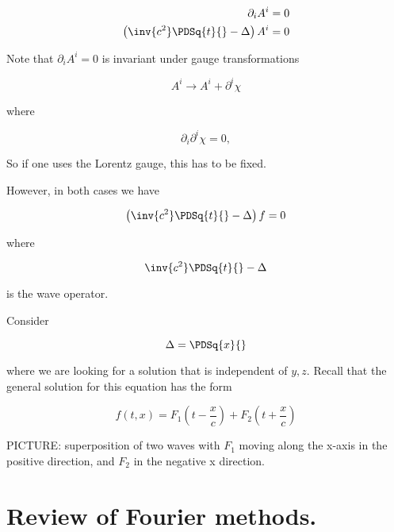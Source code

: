 \begin{align}\label{eqn:relativisticElectrodynamicsL15:30}
\partial_i A^i &= 0 \\
\left( \inv{c^2} \PDSq{t}{} - \Delta \right) A^i &= 0
\end{align}

Note that $\partial_i A^i = 0$ is invariant under gauge transformations

\begin{equation}\label{eqn:relativisticElectrodynamicsL15:50}
A^i \rightarrow A^i + \partial^i \chi
\end{equation}

where 

\begin{equation}\label{eqn:relativisticElectrodynamicsL15:70}
\partial_i \partial^i \chi = 0,
\end{equation}

So if one uses the Lorentz gauge, this has to be fixed.

However, in both cases we have 

\begin{equation}\label{eqn:relativisticElectrodynamicsL15:90}
\left( \inv{c^2} \PDSq{t}{} - \Delta \right) f = 0
\end{equation}

where 

\begin{equation}\label{eqn:relativisticElectrodynamicsL15:110}
\inv{c^2} \PDSq{t}{} - \Delta 
\end{equation}

is the wave operator.

Consider 

\begin{equation}\label{eqn:relativisticElectrodynamicsL15:130}
\Delta = \PDSq{x}{}
\end{equation}

where we are looking for a solution that is independent of $y, z$.  Recall that the general solution for this equation has the form

\begin{equation}\label{eqn:relativisticElectrodynamicsL15:150}
f(t, x) = 
F_1 \left(t - \frac{x}{c}\right)
+F_2 \left(t + \frac{x}{c}\right)
\end{equation}

PICTURE: superposition of two waves with $F_1$ moving along the x-axis in the positive direction, and $F_2$ in the negative x direction.

\section{Review of Fourier methods.}

